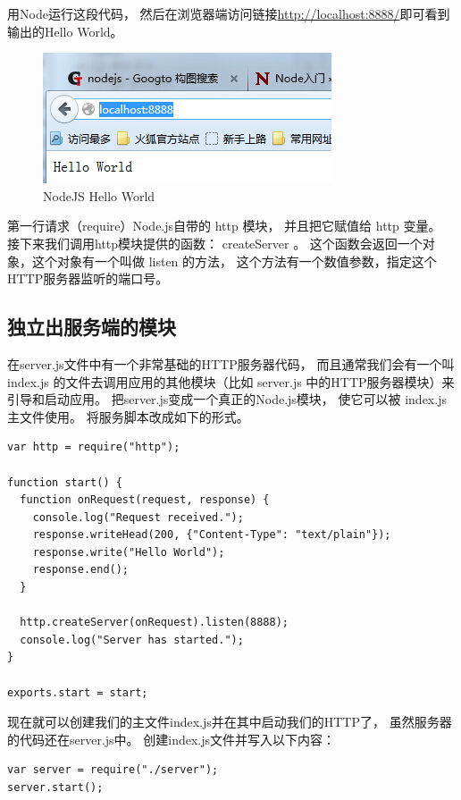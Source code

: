 \documentclass{book}
\begin{document}
用Node运行这段代码，
然后在浏览器端访问链接\url{http://localhost:8888/}即可看到输出的Hello World。

\begin{figure}[htbp]
	\centering
	\includegraphics[scale=1]{NodeJSFirstHelloWorld.jpg}
	\caption{NodeJS Hello World}
	\label{fig:NodeJSFirstHelloWorld}
\end{figure}

第一行请求（require）Node.js自带的 http 模块，
并且把它赋值给 http 变量。
接下来我们调用http模块提供的函数： createServer 。
这个函数会返回一个对象，这个对象有一个叫做 listen 的方法，
这个方法有一个数值参数，指定这个HTTP服务器监听的端口号。

\subsection{独立出服务端的模块}

在server.js文件中有一个非常基础的HTTP服务器代码，
而且通常我们会有一个叫 index.js 
的文件去调用应用的其他模块（比如 server.js 中的HTTP服务器模块）来引导和启动应用。
把server.js变成一个真正的Node.js模块，
使它可以被 index.js 主文件使用。
将服务脚本改成如下的形式。

\begin{lstlisting}[language=VBScript]
var http = require("http");

function start() {
  function onRequest(request, response) {
    console.log("Request received.");
    response.writeHead(200, {"Content-Type": "text/plain"});
    response.write("Hello World");
    response.end();
  }

  http.createServer(onRequest).listen(8888);
  console.log("Server has started.");
}

exports.start = start;
\end{lstlisting}

现在就可以创建我们的主文件index.js并在其中启动我们的HTTP了，
虽然服务器的代码还在server.js中。
创建index.js文件并写入以下内容：

\begin{lstlisting}[language=VBScript]
var server = require("./server");
server.start();
\end{lstlisting}
\end{document}
